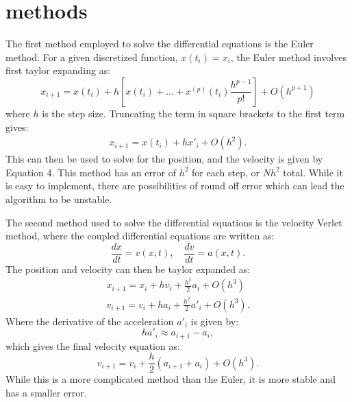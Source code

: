\documentclass[prc,amsmath,twocolumn,superscriptaddress]{revtex4}
\begin{document}
\section{methods}
\label{methods}

The first method employed to solve the differential equations is the Euler method. For a given discretized function, $x(t_i)=x_i$, the Euler method involves first taylor expanding as:
\begin{equation}
x_{i+1}= x(t_i)+h\left[x (t_i)+ ... + x^{(p)}(t_i)\frac{h^{p-1}}{p!}\right] + O(h^{p+1})
\end{equation}
where $h$ is the step size. Truncating the term in square brackets to the first term gives:
\begin{gather}
x_{i+1}= x(t_i)+hx'_i+O(h^2).
\end{gather}
This can then be used to solve for the position, and the velocity is given by Equation 4. This method has an error of $h^2$ for each step, or $Nh^2$ total. While it is easy to implement, there are possibilities of round off error which can lead the algorithm to be unstable.

The second method used to solve the differential equations is the velocity Verlet method, where the coupled differential equations are written as:
\begin{equation}
\frac{dx}{dt}=v(x,t), \quad \frac{dv}{dt}=a(x,t).
\end{equation}
The position and velocity can then be taylor expanded as:
\begin{gather}
x_{i+1}=x_i+hv_i+\frac{h^2}{2}a_i+O(h^3) \\
v_{i+1}=v_i+ha_i+\frac{h^2}{2}a'_i+O(h^3).
\end{gather}
Where the derivative of the acceleration $a'_i$ is given by:
\begin{equation}
ha'_i\approx a_{i+1}-a_i,
\end{equation}
which gives the final velocity equation as:
\begin{equation}
v_{i+1}=v_i+\frac{h}{2}\left(a_{i+1}+a_i \right) +O(h^3).
\end{equation}
While this is a more complicated method than the Euler, it is more stable and has a smaller error.
\end{document}
